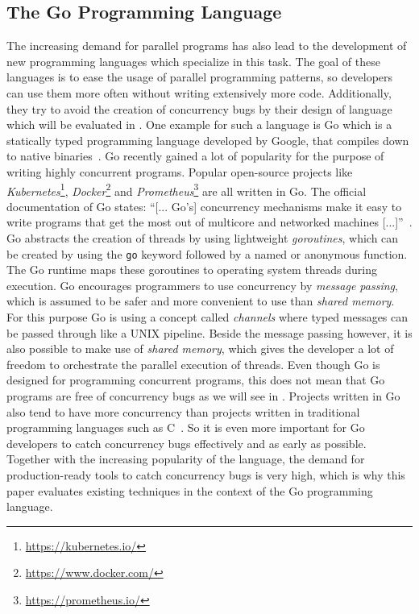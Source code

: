 \documentclass[conference]{IEEEtran}
\begin{document}
\subsection{The Go Programming Language}
The increasing demand for parallel programs has also lead to the development of new programming languages which specialize in this task.
The goal of these languages is to ease the usage of parallel programming patterns, so developers can use them more often without writing extensively more code.
Additionally, they try to avoid the creation of concurrency bugs by their design of language which will be evaluated in .
One example for such a language is Go which is a statically typed programming language developed by Google, that compiles down to native binaries~\cite{goDocs}.
Go recently gained a lot of popularity for the purpose of writing highly concurrent programs.
Popular open-source projects like \emph{Kubernetes}\footnote{\url{https://kubernetes.io/}}, \emph{Docker}\footnote{\url{https://www.docker.com/}} and \emph{Prometheus}\footnote{\url{https://prometheus.io/}} are all written in Go.
The official documentation of Go states: ``[... Go's] concurrency mechanisms make it easy to write programs that get the most out of multicore and networked machines [...]''~\cite{goDocs}.
Go abstracts the creation of threads by using lightweight \emph{goroutines}, which can be created by using the \lstinline{go} keyword followed by a named or anonymous function.
The Go runtime maps these goroutines to operating system threads during execution.
Go encourages programmers to use concurrency by \emph{message passing}, which is assumed to be safer and more convenient to use than \emph{shared memory}.
For this purpose Go is using a concept called \emph{channels} where typed messages can be passed through like a UNIX pipeline.
Beside the message passing however, it is also possible to make use of \emph{shared memory}, which gives the developer a lot of freedom to orchestrate the parallel execution of threads.
Even though Go is designed for programming concurrent programs, this does not mean that Go programs are free of concurrency bugs as we will see in .
Projects written in Go also tend to have more concurrency than projects written in traditional programming languages such as C~\cite{tu2019go}.
So it is even more important for Go developers to catch concurrency bugs effectively and as early as possible.
Together with the increasing popularity of the language, the demand for production-ready tools to catch concurrency bugs is very high, which is why this paper evaluates existing techniques in the context of the Go programming language.
\end{document}
